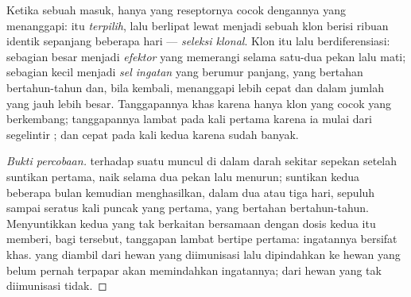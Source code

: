\begin{proposition}\label{prop:g12:adaptive-immunity:selection}
Ketika sebuah  masuk, hanya  yang reseptornya cocok
dengannya yang menanggapi:  itu \emph{terpilih}, lalu berlipat
lewat  menjadi sebuah klon berisi ribuan  identik sepanjang
beberapa hari --- \emph{seleksi klonal}. Klon itu
lalu berdiferensiasi: sebagian besar  menjadi \emph{ efektor}
yang memerangi  selama satu-dua pekan lalu mati; sebagian
kecil menjadi \emph{sel ingatan} yang berumur
panjang, yang bertahan bertahun-tahun dan, bila  kembali,
menanggapi lebih cepat dan dalam jumlah yang jauh lebih besar.
Tanggapannya khas karena hanya klon yang cocok yang berkembang;
tanggapannya lambat pada kali pertama karena ia mulai dari segelintir
; dan cepat pada kali kedua karena  sudah banyak.
\end{proposition}
\begin{proof}[Bukti percobaan]
 terhadap suatu  muncul di dalam darah sekitar sepekan
setelah suntikan pertama, naik selama dua pekan lalu menurun; suntikan
kedua beberapa bulan kemudian menghasilkan, dalam dua atau tiga hari,
 sepuluh sampai seratus kali puncak yang pertama, yang bertahan
bertahun-tahun. Menyuntikkan  kedua yang tak berkaitan
bersamaan dengan dosis kedua itu memberi, bagi  tersebut,
tanggapan lambat bertipe pertama: ingatannya bersifat khas. 
yang diambil dari hewan yang diimunisasi lalu dipindahkan ke hewan yang
belum pernah terpapar akan memindahkan ingatannya;  dari hewan
yang tak diimunisasi tidak.
\end{proof}

